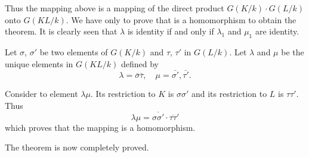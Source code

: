 Thus the mapping above is a mapping of the direct product $G(K/k) \cdot
G(L/k)$ onto $G(KL/k)$. We have only to prove that is a homomorphism
to obtain the theorem. It is clearly seen that $\lambda$ is identity
if and only if $\lambda_1$ and $\mu_1$ are identity.  

Let $\sigma$, $\sigma'$ be two elements of $G(K/k)$ and $\tau$, $\tau'$ in
$G(L/k)$. Let $\lambda$ and $\mu$ be the unique elements in $G(KL/k)$
defined by  
$$
\lambda = \bar{\sigma} \bar{\tau}, \quad \mu = \bar{\sigma'}, \bar{\tau'}. 
$$ 

Consider to element $\lambda \mu$. Its restriction to $K$ is $\sigma
\sigma'$ and its restriction to $L$ is $\tau \tau'$. Thus 
$$
\lambda \mu = \overline{\sigma \sigma'} \cdot \overline{\tau \tau}'
$$
which proves that the mapping is a homomorphism. 

The theorem is now completely proved.



